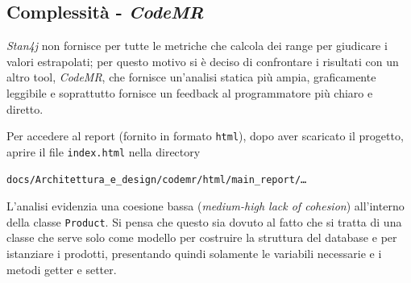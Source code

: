 \documentclass{article}
\begin{document}
\subsection{Complessità - \textit{CodeMR}}
\textit{Stan4j} non fornisce per tutte le metriche che calcola dei range per giudicare i valori estrapolati; per questo motivo si è deciso di confrontare i risultati con un altro tool, \textit{CodeMR}, che fornisce un'analisi statica più ampia, graficamente leggibile e soprattutto fornisce un feedback al programmatore più chiaro e diretto. \newline 

Per accedere al report (fornito in formato \texttt{html}), dopo aver scaricato il progetto, aprire il file \texttt{index.html} nella directory
\begin{code*}{}
\texttt{docs/Architettura\_e\_design/codemr/html/main\_report/\dots}
\end{code*}


L'analisi evidenzia una coesione bassa (\textit{medium-high lack of cohesion}) all'interno della classe \texttt{Product}. Si pensa che questo sia dovuto al fatto che si tratta di una classe che serve solo come modello per costruire la struttura del database e per istanziare i prodotti, presentando quindi solamente le variabili necessarie e i metodi getter e setter. 
\end{document}
